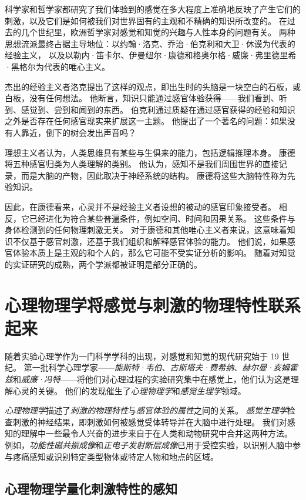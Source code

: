 科学家和哲学家都研究了我们体验到的感觉在多大程度上准确地反映了产生它们的刺激，以及它们是如何被我们对世界固有的主观和不精确的知识所改变的。 
在过去的几个世纪里，欧洲哲学家对感觉和知觉的兴趣与人性本身的问题有关。 
两种思想流派最终占据主导地位：以约翰·洛克、乔治·伯克利和大卫·休谟为代表的经验主义，
以及以勒内·笛卡尔、伊曼纽尔·康德和格奥尔格·威廉·弗里德里希·黑格尔为代表的唯心主义。


杰出的经验主义者洛克提出了这样的观点，即出生时的头脑是一块空白的石板，或白板，没有任何想法。 
他断言，知识只能通过感官体验获得——我们看到、听到、感觉到、尝到和闻到的东西。 
伯克利通过质疑在通过感官获得的经验和知识之外是否存在任何感官现实来扩展这一主题。 
他提出了一个著名的问题：如果没有人靠近，倒下的树会发出声音吗？


理想主义者认为，人类思维具有某些与生俱来的能力，包括逻辑推理本身。
康德将五种感官归类为人类理解的类别。
他认为，感知不是我们周围世界的直接记录，而是大脑的产物，因此取决于神经系统的结构。
康德将这些大脑特性称为先验知识。


因此，在康德看来，心灵并不是经验主义者设想的被动的感官印象接受者。 
相反，它已经进化为符合某些普遍条件，例如空间、时间和因果关系。 
这些条件与身体检测到的任何物理刺激无关。 
对于康德和其他唯心主义者来说，这意味着知识不仅基于感官刺激，还基于我们组织和解释感官体验的能力。 
他们说，如果感官体验本质上是主观的和个人的，那么它可能不受实证分析的影响。
随着对知觉的实证研究的成熟，两个学派都被证明是部分正确的。



\section{心理物理学将感觉与刺激的物理特性联系起来}

随着实验心理学作为一门科学学科的出现，对感觉和知觉的现代研究始于 19 世纪。 
第一批科学心理学家——\textit{能斯特·韦伯}、\textit{古斯塔夫·费希纳}、\textit{赫尔曼·亥姆霍兹}和\textit{威廉·冯特}——将他们对心理过程的实验研究集中在感觉上，他们认为这是理解心灵的关键。
他们的发现催生了\textit{心理物理学}和\textit{感觉生理学}领域。


\textit{心理物理学}描述了\textit{刺激的物理特性}与\textit{感官体验的属性}之间的关系。 
\textit{感觉生理学}检查刺激的神经结果，即刺激如何被感觉受体转导并在大脑中进行处理。 
我们对感知的理解中一些最令人兴奋的进步来自于在人类和动物研究中合并这两种方法。 
例如，\textit{功能性磁共振成像}和\textit{正电子发射断层成像}已用于受控实验，以识别人脑中参与疼痛感知或识别特定类型物体或特定人物和地点的区域。


\subsection{心理物理学量化刺激特性的感知}

